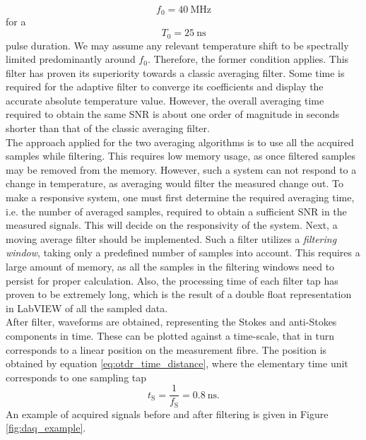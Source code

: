 \documentclass{standalone}
\begin{document}
\begin{equation}
f_0 = \SI{40}{\mega \hertz}
\end{equation}
for a
\begin{equation}
T_0 = \SI{25}{\nano \second}
\end{equation}
pulse duration. We may assume any relevant temperature shift to be spectrally limited predominantly around $f_0$. Therefore, the former condition applies. This filter has proven its superiority towards a classic averaging filter. Some time is required for the adaptive filter to converge its coefficients and display the accurate absolute temperature value. However, the overall averaging time required to obtain the same SNR is about one order of magnitude in seconds shorter than that of the classic averaging filter. \\

The approach applied for the two averaging algorithms is to use all the acquired samples while filtering. This requires low memory usage, as once filtered samples may be removed from the memory. However, such a system can not respond to a change in temperature, as averaging would filter the measured change out. To make a responsive system, one must first determine the required averaging time, i.e. the number of averaged samples, required to obtain a sufficient SNR in the measured signals. This will decide on the responsivity of the system. Next, a moving average filter should be implemented. Such a filter utilizes a \textit{filtering window}, taking only a predefined number of samples into account. This requires a large amount of memory, as all the samples in the filtering windows need to persist for proper calculation. Also, the processing time of each filter tap has proven to be extremely long, which is the result of a double float representation in LabVIEW of all the sampled data. \\

After filter, waveforms are obtained, representing the Stokes and anti-Stokes components in time. These can be plotted against a time-scale, that in turn corresponds to a linear position on the measurement fibre. The position is obtained by equation \ref{eq:otdr_time_distance}, where the elementary time unit corresponds to one sampling tap
\begin{equation}
t_\textrm{S} = \frac{1}{f_\textrm{S}} = \SI{0.8}{\nano \second} \textrm{.}
\end{equation}
An example of acquired signals before and after filtering is given in Figure \ref{fig:daq_example}.
\end{document}

